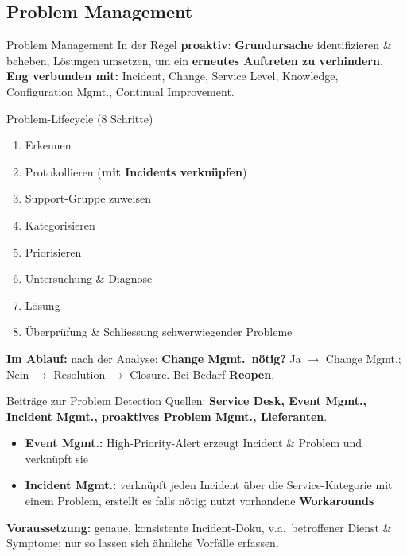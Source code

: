 \documentclass[a4paper, fontsize=7pt]{scrartcl}
\begin{document}
\subsection{Problem Management}

\begin{mainbox}{Problem Management}
In der Regel \textbf{proaktiv}: \textbf{Grundursache} identifizieren \& beheben,
Lösungen umsetzen, um ein \textbf{erneutes Auftreten zu verhindern}.\\
\textbf{Eng verbunden mit:} Incident, Change, Service Level, Knowledge,
Configuration Mgmt., Continual Improvement.
\end{mainbox}

\begin{mainbox}{Problem-Lifecycle (8 Schritte)}
\begin{enumerate}
    \item Erkennen
    \item Protokollieren (\textbf{mit Incidents verknüpfen})
    \item Support-Gruppe zuweisen
    \item Kategorisieren
    \item Priorisieren
    \item Untersuchung \& Diagnose
    \item Lösung
    \item Überprüfung \& Schliessung schwerwiegender Probleme
\end{enumerate}
\textbf{Im Ablauf:} nach der Analyse: \textbf{Change Mgmt.\ nötig?} Ja $\to$ Change
Mgmt.; Nein $\to$ Resolution $\to$ Closure. Bei Bedarf \textbf{Reopen}.
\end{mainbox}

\begin{mainbox}{Beiträge zur Problem Detection}
Quellen: \textbf{Service Desk, Event Mgmt., Incident Mgmt., proaktives Problem
Mgmt., Lieferanten}.
\begin{itemize}
    \item \textbf{Event Mgmt.:} High-Priority-Alert erzeugt Incident \& Problem
          und verknüpft sie
    \item \textbf{Incident Mgmt.:} verknüpft jeden Incident über die
          Service-Kategorie mit einem Problem, erstellt es falls nötig; nutzt
          vorhandene \textbf{Workarounds}
\end{itemize}
\textbf{Voraussetzung:} genaue, konsistente Incident-Doku, v.a.\ betroffener
Dienst \& Symptome; nur so lassen sich ähnliche Vorfälle erfassen.
\end{mainbox}
\end{document}
